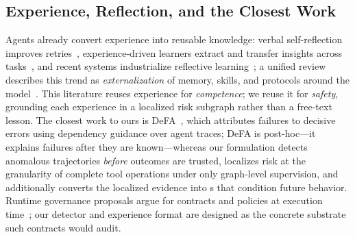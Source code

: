 \subsection{Experience, Reflection, and the Closest Work}
Agents already convert experience into reusable knowledge: verbal self-reflection improves retries~\cite{shinn2023reflexion}, experience-driven learners extract and transfer insights across tasks~\cite{zhao2023expel}, and recent systems industrialize reflective learning~\cite{allard2026experiential}; a unified review describes this trend as \emph{externalization} of memory, skills, and protocols around the model~\cite{zhou2026externalization}. This literature reuses experience for \emph{competence}; we reuse it for \emph{safety}, grounding each experience in a localized risk subgraph rather than a free-text lesson. The closest work to ours is DeFA~\cite{deng2026defa}, which attributes failures to decisive errors using dependency guidance over agent traces; DeFA is post-hoc---it explains failures after they are known---whereas our formulation detects anomalous trajectories \emph{before} outcomes are trusted, localizes risk at the granularity of complete tool operations under only graph-level supervision, and additionally converts the localized evidence into \sexp{}s that condition future behavior. Runtime governance proposals argue for contracts and policies at execution time~\cite{ng2026agent,joshi2026deontic,errico2025securing}; our detector and experience format are designed as the concrete substrate such contracts would audit.
